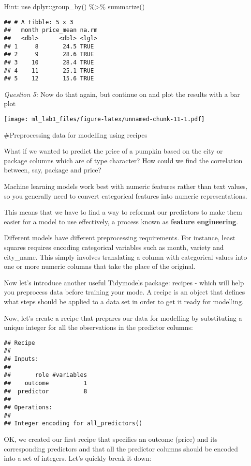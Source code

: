 \documentclass[
]{article}
\begin{document}
Hint: use dplyr::group\_by() \%\textgreater\% summarize()

\begin{verbatim}
## # A tibble: 5 x 3
##   month price_mean na.rm
##   <dbl>      <dbl> <lgl>
## 1     8       24.5 TRUE 
## 2     9       28.6 TRUE 
## 3    10       28.4 TRUE 
## 4    11       25.1 TRUE 
## 5    12       15.6 TRUE
\end{verbatim}

\emph{Question 5:} Now do that again, but continue on and plot the
results with a bar plot

\texttt{[image: ml\_lab1\_files/figure-latex/unnamed-chunk-11-1.pdf]}

\#Preprocessing data for modelling using recipes

What if we wanted to predict the price of a pumpkin based on the city or
package columns which are of type character? How could we find the
correlation between, say, package and price?

Machine learning models work best with numeric features rather than text
values, so you generally need to convert categorical features into
numeric representations.

This means that we have to find a way to reformat our predictors to make
them easier for a model to use effectively, a process known as
\textbf{feature engineering}.

Different models have different preprocessing requirements. For
instance, least squares requires encoding categorical variables such as
month, variety and city\_name. This simply involves translating a column
with categorical values into one or more numeric columns that take the
place of the original.

Now let's introduce another useful Tidymodels package: recipes - which
will help you preprocess data before training your mode. A recipe is an
object that defines what steps should be applied to a data set in order
to get it ready for modelling.

Now, let's create a recipe that prepares our data for modelling by
substituting a unique integer for all the observations in the predictor
columns:

\begin{verbatim}
## Recipe
## 
## Inputs:
## 
##       role #variables
##    outcome          1
##  predictor          8
## 
## Operations:
## 
## Integer encoding for all_predictors()
\end{verbatim}

OK, we created our first recipe that specifies an outcome (price) and
its corresponding predictors and that all the predictor columns should
be encoded into a set of integers. Let's quickly break it down:
\end{document}

